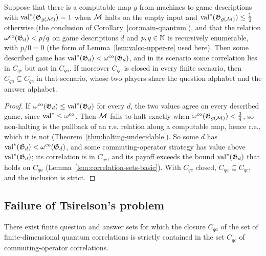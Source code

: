 \begin{lemma}
\label{lem:tsirelson-conditional}
\leanok
Suppose that there is a computable map $g$ from machines to game descriptions with
$\mathrm{val}^*(\mathfrak{G}_{g(\mathcal{M})}) = 1$ when $\mathcal{M}$ halts on the empty input and
$\mathrm{val}^*(\mathfrak{G}_{g(\mathcal{M})}) \leq \frac12$ otherwise (the conclusion of
Corollary~\ref{cor:main-quantum}), and that the relation $\omega^{\mathrm{co}}(\mathfrak{G}_d) < p/q$ on game
descriptions $d$ and $p, q \in \mathbb{N}$ is recursively enumerable, with $p/0 = 0$ (the form of
Lemma~\ref{lem:valco-upper-re} used here). Then some described game has
$\mathrm{val}^*(\mathfrak{G}_d) < \omega^{\mathrm{co}}(\mathfrak{G}_d)$, and in its scenario some correlation lies in
$C_{qc}$ but not in $C_{qa}$. If moreover $C_{qc}$ is closed in every finite scenario, then
$C_{qa} \subsetneq C_{qc}$ in that scenario, whose two players share the question alphabet
and the answer alphabet.
\end{lemma}

\begin{proof}
\leanok
If $\omega^{\mathrm{co}}(\mathfrak{G}_d) \leq \mathrm{val}^*(\mathfrak{G}_d)$ for every $d$, the two values agree on every
described game, since $\mathrm{val}^* \leq \omega^{\mathrm{co}}$. Then $\mathcal{M}$ fails to halt exactly when
$\omega^{\mathrm{co}}(\mathfrak{G}_{g(\mathcal{M})}) < \frac34$, so non-halting is the pullback of an r.e. relation
along a computable map, hence r.e., which it is not
(Theorem~\ref{thm:halting-undecidable}). So some $d$ has $\mathrm{val}^*(\mathfrak{G}_d) <
\omega^{\mathrm{co}}(\mathfrak{G}_d)$, and some commuting-operator strategy has value above $\mathrm{val}^*(\mathfrak{G}_d)$;
its correlation is in $C_{qc}$, and its payoff exceeds the bound $\mathrm{val}^*(\mathfrak{G}_d)$ that
holds on $C_{qa}$ (Lemma~\ref{lem:correlation-sets-basic}). With $C_{qc}$ closed,
$C_{qa} \subseteq C_{qc}$, and the inclusion is strict.
\end{proof}

\subsection{Failure of Tsirelson's problem}

\begin{corollary}
\label{cor:tsirelson}
\leanok
There exist finite question and answer sets for which the closure $C_{qa}$ of the set
of finite-dimensional quantum correlations is strictly contained in the set $C_{qc}$
of commuting-operator correlations.
\end{corollary}

